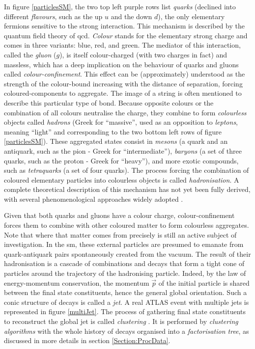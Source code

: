 In figure \ref{particlesSM}, the two top left purple rows list \textit{quarks} (declined into different \textit{flavours}, such as the up $u$ and the down $d$), the only elementary fermions sensitive to the strong interaction. This mechanism is described by the quantum field theory of \gls{qcd}. \textit{Colour} stands for the elementary strong charge and comes in three variants: blue, red, and green. The mediator of this interaction, called the \textit{gluon} ($g$), is itself colour-charged (with two charges in fact) and massless, which has a deep implication on the behaviour of quarks and gluons called \textit{colour-confinement}. This effect can be (approximately) understood as the strength of the colour-bound increasing with the distance of separation, forcing coloured-components to aggregate. The image of a string is often mentioned to describe this particular type of bond. Because opposite colours or the combination of all colours neutralise the charge, they combine to form \textit{colourless} objects called \textit{hadrons} (Greek for ``massive'', used as an opposition to \textit{leptons}, meaning ``light'' and corresponding to the two bottom left rows of figure \ref{particlesSM}). These aggregated states consist in \textit{mesons} (a quark and an antiquark, such as the pion - Greek for ``intermediate''), \textit{baryons} (a set of three quarks, such as the proton - Greek for ``heavy''), and more exotic compounds, such as \textit{tetraquarks} (a set of four quarks). The process forcing the combination of coloured elementary particles into colourless objects is called \textit{hadronisation}. A complete theoretical description of this mechanism has not yet been fully derived, with several phenomenological approaches widely adopted \cite{Looking_Inside_Jet}. 

Given that both quarks and gluons have a colour charge, colour-confinement forces them to combine with other coloured matter to form colourless aggregates. Note that where that matter comes from precisely is still an active subject of investigation. In the \gls{sm}, these external particles are presumed to emanate from quark-antiquark pairs spontaneously created from the vacuum. The result of their hadronisation is a cascade of combinations and decays that form a tight cone of particles around the trajectory of the hadronising particle. Indeed, by the law of energy-momentum conservation, the momentum $\vec{p}$ of the initial particle is shared between the final state constituents, hence the general global orientation. Such a conic structure of decays is called a \textit{jet}. A real ATLAS event with multiple jets is represented in figure \ref{multiJet}. The process of gathering final state constituents to reconstruct the global jet is called \textit{clustering} \cite{Looking_Inside_Jet}. It is performed by \textit{clustering algorithms} with the whole history of decays organised into a \textit{factorisation tree}, as discussed in more details in section \ref{Section:ProcData}.

